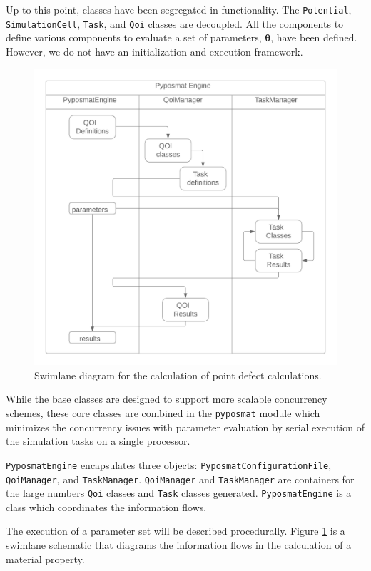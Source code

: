 Up to this point, classes have been segregated in functionality.  The \verb|Potential|, \verb|SimulationCell|, \verb|Task|, and \verb|Qoi| classes are decoupled.  All the components to define various components to evaluate a set of parameters, $\bm{\theta}$, have been defined.  However, we do not have an initialization and execution framework.
\begin{figure}[!htbp]
	\centering
	\includegraphics[width=5in]{chapter6/img/pypospack_coordination}
	\caption{Swimlane diagram for the calculation of point defect calculations.}
	\label{fig:pypospack_coordination}
\end{figure}

While the base classes are designed to support more scalable concurrency schemes, these core classes are combined in the \verb|pyposmat| module which minimizes the concurrency issues with parameter evaluation by serial execution of the simulation tasks on a single processor.

\verb|PyposmatEngine| encapsulates three objects: \verb|PyposmatConfigurationFile|, \verb|QoiManager|, and \verb|TaskManager|.
\verb|QoiManager| and \verb|TaskManager| are containers for the large numbers \verb|Qoi| classes and \verb|Task| classes generated.    \verb|PyposmatEngine| is a class which coordinates the information flows.

The execution of a parameter set will be described procedurally.  Figure \ref{fig:pypospack_coordination} is a swimlane schematic that diagrams the information flows in the calculation of a material property.

